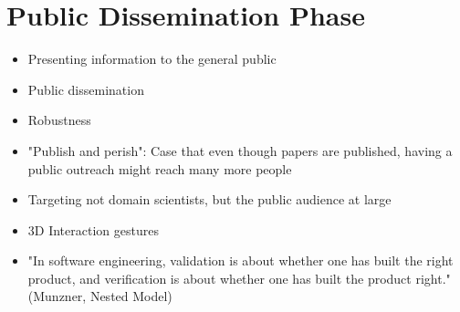 \section{Public Dissemination Phase}
\begin{itemize}
\item Presenting information to the general public
\item Public dissemination
\item Robustness
\item "Publish and perish": Case that even though papers are published, having a public outreach might reach many more people
\item Targeting not domain scientists, but the public audience at large
\item 3D Interaction gestures
\item "In software engineering, validation is about whether one has built the right product, and verification is about whether one has built the product right." (Munzner, Nested Model)


\end{itemize}

